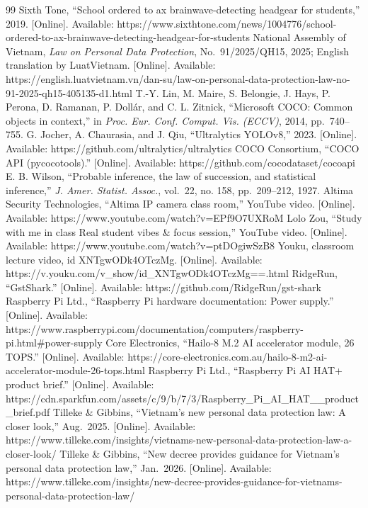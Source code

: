 \begin{thebibliography}{99}
 Sixth Tone, ``School ordered to ax brainwave-detecting headgear for students,'' 2019. {[}Online{]}. Available: https://www.sixthtone.com/news/1004776/school-ordered-to-ax-brainwave-detecting-headgear-for-students
 National Assembly of Vietnam, \emph{Law on Personal Data Protection}, No.~91/2025/QH15, 2025; English translation by LuatVietnam. {[}Online{]}. Available: https://english.luatvietnam.vn/dan-su/law-on-personal-data-protection-law-no-91-2025-qh15-405135-d1.html
 T.-Y. Lin, M. Maire, S. Belongie, J. Hays, P. Perona, D. Ramanan, P. Dollár, and C. L. Zitnick, ``Microsoft COCO: Common objects in context,'' in \emph{Proc. Eur. Conf. Comput. Vis. (ECCV)}, 2014, pp.~740--755.
 G. Jocher, A. Chaurasia, and J. Qiu, ``Ultralytics YOLOv8,'' 2023. {[}Online{]}. Available: https://github.com/ultralytics/ultralytics
 COCO Consortium, ``COCO API (pycocotools).'' {[}Online{]}. Available: https://github.com/cocodataset/cocoapi
 E. B. Wilson, ``Probable inference, the law of succession, and statistical inference,'' \emph{J. Amer. Statist. Assoc.}, vol.~22, no. 158, pp.~209--212, 1927.
 Altima Security Technologies, ``Altima IP camera class room,'' YouTube video. {[}Online{]}. Available: https://www.youtube.com/watch?v=EPf9O7UXRoM
 Lolo Zou, ``Study with me in class \textbar{} Real student vibes \& focus session,'' YouTube video. {[}Online{]}. Available: https://www.youtube.com/watch?v=ptDOgiwSzB8
 Youku, classroom lecture video, id XNTgwODk4OTczMg. {[}Online{]}. Available: https://v.youku.com/v\_show/id\_XNTgwODk4OTczMg==.html
 RidgeRun, ``GstShark.'' {[}Online{]}. Available: https://github.com/RidgeRun/gst-shark
 Raspberry Pi Ltd., ``Raspberry Pi hardware documentation: Power supply.'' {[}Online{]}. Available: https://www.raspberrypi.com/documentation/computers/raspberry-pi.html\#power-supply
 Core Electronics, ``Hailo-8 M.2 AI accelerator module, 26 TOPS.'' {[}Online{]}. Available: https://core-electronics.com.au/hailo-8-m2-ai-accelerator-module-26-tops.html
 Raspberry Pi Ltd., ``Raspberry Pi AI HAT+ product brief.'' {[}Online{]}. Available: https://cdn.sparkfun.com/assets/c/9/b/7/3/Raspberry\_Pi\_AI\_HAT\_\_product\_brief.pdf
 Tilleke \& Gibbins, ``Vietnam's new personal data protection law: A closer look,'' Aug.~2025. {[}Online{]}. Available: https://www.tilleke.com/insights/vietnams-new-personal-data-protection-law-a-closer-look/
 Tilleke \& Gibbins, ``New decree provides guidance for Vietnam's personal data protection law,'' Jan.~2026. {[}Online{]}. Available: https://www.tilleke.com/insights/new-decree-provides-guidance-for-vietnams-personal-data-protection-law/

\end{thebibliography}
